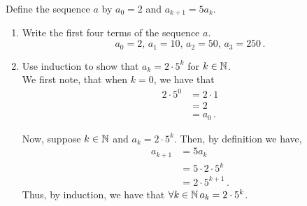 \guard




\begin{exmp}
\label{exmp:showClosedFormFormulaWorks}
  Define the sequence $a$ by $a_0=2$ and $a_{k+1} = 5a_k$.
  \begin{enumerate}
    \item Write the first four terms of the sequence $a$.\\
    \[ a_0 = 2,\,a_1=10,\,a_2=50,\,a_3=250\,.\]
    \item Use induction to show that $a_k=2\cdot 5^k$ for $k\in\mathbb{N}$.\\
    We first note, that when $k=0$, we have that
    \begin{align*}
      2\cdot 5^0  &= 2 \cdot 1 \\
                  &= 2 \\
                  &= a_0\,.
    \end{align*}

    Now, suppose $k\in\mathbb{N}$ and $a_k = 2\cdot 5^k$.
    Then, by definition we have,
    \begin{align*}
      a_{k+1} &= 5a_k \\
              &= 5\cdot 2 \cdot 5^k \\
              &= 2 \cdot 5^{k+1}\,.
    \end{align*}
    Thus, by induction, we have that $\forall k\in\mathbb{N}\,a_k=2\cdot 5^k$.
  \end{enumerate}
\end{exmp}
